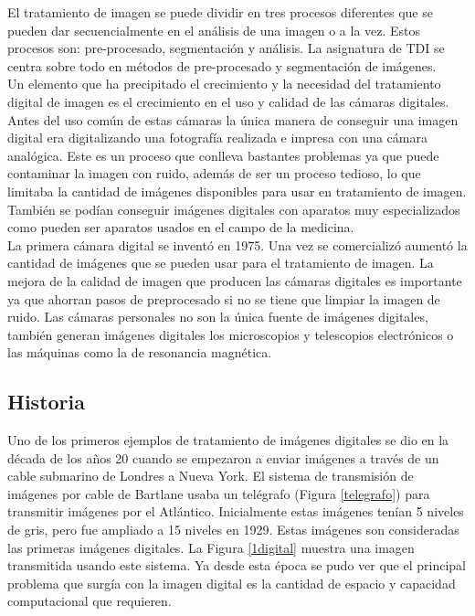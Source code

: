 El tratamiento de imagen se puede dividir en tres procesos diferentes que se pueden dar secuencialmente en el análisis de una imagen o a la vez. Estos procesos son: pre-procesado, segmentación y análisis. La asignatura de TDI se centra sobre todo en métodos de pre-procesado y segmentación de imágenes.\\ 

Un elemento que ha precipitado el crecimiento y la necesidad del tratamiento digital de imagen es el crecimiento en el uso y calidad de las cámaras digitales. Antes del uso común de estas cámaras la única manera de conseguir una imagen digital era digitalizando una fotografía realizada e impresa con una cámara analógica. Este es  un proceso que conlleva bastantes problemas ya que puede contaminar la imagen con ruido, además de ser un proceso tedioso, lo que limitaba la cantidad de imágenes disponibles para usar en tratamiento de imagen. También se podían conseguir imágenes digitales con aparatos muy especializados como pueden ser aparatos usados en el campo de la medicina.\\

La primera cámara digital se inventó en 1975. Una vez se comercializó aumentó la cantidad de imágenes que se pueden usar para el tratamiento de imagen. La mejora de la calidad de imagen que producen las cámaras digitales es importante ya que ahorran pasos de preprocesado si no se tiene que limpiar la imagen de ruido. Las cámaras personales no son la única fuente de imágenes digitales, también generan imágenes digitales los microscopios y telescopios electrónicos o las máquinas como la de resonancia magnética.\\


\subsection{Historia}
Uno de los primeros ejemplos de tratamiento de imágenes digitales se dio en la década de los años 20 cuando se empezaron a enviar imágenes a través de un cable submarino de Londres a Nueva York. El sistema de transmisión de imágenes por cable de Bartlane usaba un telégrafo (Figura \ref{telegrafo}) para transmitir imágenes por el Atlántico\cite{Historia3}. Inicialmente estas imágenes tenían 5 niveles de gris, pero fue ampliado a 15 niveles en 1929. Estas imágenes son consideradas las primeras imágenes digitales. La Figura \ref{1digital} muestra una imagen transmitida usando este sistema. Ya desde esta época se pudo ver que el principal problema que surgía con la imagen digital es la cantidad de espacio y capacidad computacional que requieren.\\

